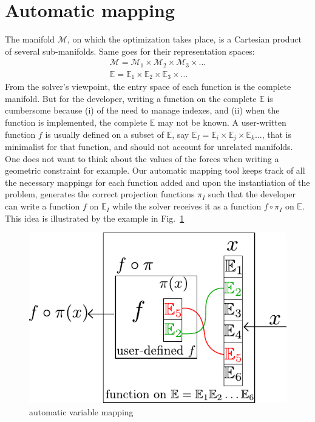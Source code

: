 \section{Automatic mapping}
\label{sec:automatic_mapping}

The manifold $\mathcal{M}$, on which the optimization takes place, is a Cartesian product of several sub-manifolds. Same goes for their representation spaces:
\begin{equation}
  \begin{split}
    \mathcal{M} = \mathcal{M}_1\times\mathcal{M}_2\times\mathcal{M}_3\times\hdots\\
    \mathbb{E} = \mathbb{E}_1\times\mathbb{E}_2\times\mathbb{E}_3\times\hdots
  \end{split}
\end{equation}
From the solver's viewpoint, the entry space of each function is the complete manifold.
But for the developer, writing a function on the complete $\mathbb{E}$ is cumbersome because (i) of the need to manage indexes, and (ii) when the function is implemented, the complete $\mathbb{E}$ may not be known.
A user-written function $f$ is usually defined on a subset of $\mathbb{E}$, say $\mathbb{E}_I=\mathbb{E}_i\times\mathbb{E}_j\times\mathbb{E}_k\hdots$, that is minimalist for that function, and should not account for unrelated manifolds.
One does not want to think about the values of the forces when writing a geometric constraint for example.
Our automatic mapping tool keeps track of all the necessary mappings for each function added and upon the instantiation of the problem, generates the correct projection functions $\pi_I$ such that the developer can write a function $f$ on $\mathbb{E}_I$ while the solver receives it as a function $f \circ \pi_I$ on $\mathbb{E}$.
This idea is illustrated by the example in Fig.~\ref{fig:auto_map}

\begin{figure}[!htb]
\centering
  \centering
  \setlength\fboxsep{0pt}
  \includegraphics[width=.5\linewidth]{Chapter4-NewPG/Figs/auto_mapping_text.pdf}
\caption{automatic variable mapping}
\label{fig:auto_map}
\end{figure}

